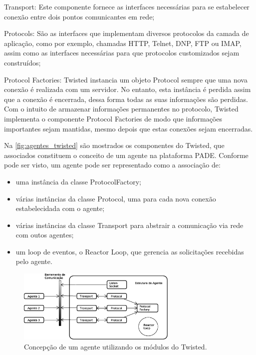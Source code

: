 \documentclass[journal]{IEEEtran}
\begin{document}
Transport: Este componente fornece as interfaces necessárias para se estabelecer conexão entre dois pontos comunicantes em rede;

Protocols: São as interfaces que implementam diversos protocolos da camada de aplicação, como por exemplo, chamadas HTTP, Telnet, DNP, FTP ou IMAP, assim como as interfaces necessárias para que protocolos customizados sejam construídos;

Protocol Factories: Twisted instancia um objeto Protocol sempre que uma nova conexão é realizada com um servidor. No entanto, esta instância é perdida assim que a conexão é encerrada, dessa forma todas as suas informações são perdidas. Com o intuito de armazenar informações permanentes no protocolo, Twisted implementa o componente Protocol Factories de modo que informações importantes sejam mantidas, mesmo depois que estas conexões sejam encerradas.

Na \autoref{fig:agentes_twisted} são mostrados os componentes do Twisted, que associados constituem o conceito de um agente na plataforma PADE. Conforme pode ser visto, um agente pode ser representado como a associação de:

\begin{itemize}
  \item uma instância da classe ProtocolFactory;
  \item várias instâncias da classe Protocol, uma para cada nova conexão estabelecidada com o agente;
  \item várias instâncias da classe Transport para abstrair a comunicação via rede com outos agentes;
  \item um loop de eventos, o Reactor Loop, que gerencia as solicitações recebidas pelo agente.
\end{itemize}

\begin{figure}[htb]
    \centering
    \includegraphics[width=3.0in]{Figuras/agente_twisted.eps}
    
    \caption{\label{fig:agentes_twisted} Concepção de um agente utilizando os módulos do Twisted.}
\end{figure}
\end{document}
